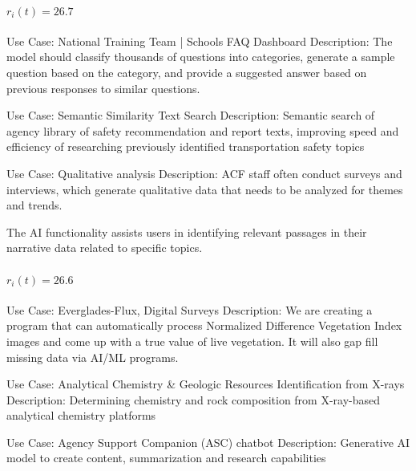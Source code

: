 \paragraph{$r_i(t) = 26.7$}
\begin{description}[style=nextline,leftmargin=1em,font=\normalfont\bfseries]
  \item[Anchor] Use Case: National Training Team | Schools  FAQ Dashboard
Description: The model should classify thousands of questions into categories, generate a sample question based on the category, and provide a suggested answer based on previous responses to similar questions.
  \item[Human-judged closer] Use Case: Semantic Similarity Text Search
Description: Semantic search of agency library of safety recommendation and report texts, improving speed and efficiency of researching previously identified transportation safety topics
  \item[Human-judged farther] Use Case: Qualitative analysis
Description: ACF staff often conduct surveys and interviews, which generate qualitative data that needs to be analyzed for themes and trends.

The AI functionality assists users in identifying relevant passages in their narrative data related to specific topics.
\end{description}
\paragraph{$r_i(t) = 26.6$}
\begin{description}[style=nextline,leftmargin=1em,font=\normalfont\bfseries]
  \item[Anchor] Use Case: Everglades-Flux, Digital Surveys
Description: We are creating a program that can automatically process Normalized Difference Vegetation Index images and come up with a true value of live vegetation. It will also gap fill missing data via AI/ML programs.
  \item[Human-judged closer] Use Case: Analytical Chemistry \& Geologic Resources Identification from X-rays
Description:   Determining chemistry and rock composition from X-ray-based analytical chemistry platforms
  \item[Human-judged farther] Use Case: Agency Support Companion (ASC) chatbot
Description: Generative AI model to create content, summarization and research capabilities
\end{description}
